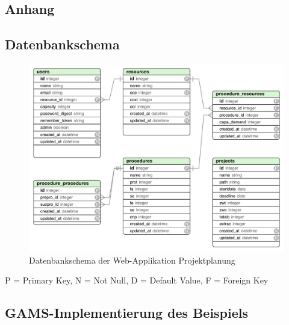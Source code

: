 \documentclass[a4paper,12pt,parskip,bibtotoc,liststotoc]{article}
\begin{document}
\newpage

\newpage
%
%
\begin{appendix}
\section{Anhang}

\subsection{Datenbankschema}\label{db-schema}

\begin{figure}[h!]
  \begin{center}
    \includegraphics[width=150mm]{Bilder/DB.pdf}
    \caption{Datenbankschema der Web-Applikation Projektplanung}  \label{schema}
  \end{center}
\end{figure}

P = Primary Key, N = Not Null, D = Default Value, F = Foreign Key

\subsection{GAMS-Implementierung des Beispiels}\label{Imp}
%



\end{appendix}
\end{document}
